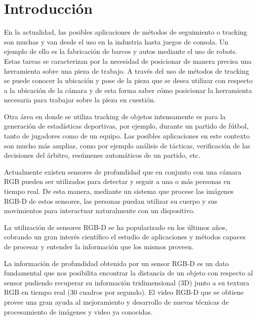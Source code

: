\chapter{Introducción}
En la actualidad, las posibles aplicaciones de métodos de seguimiento o tracking son muchas y van desde el uso en la industria hasta juegos de consola. Un ejemplo de ello es la fabricación de barcos y autos mediante el uso de robots. Estas tareas se caracterizan por la necesidad de posicionar de manera precisa una herramienta sobre una pieza de trabajo. A través del uso de métodos de tracking se puede conocer la ubicación y pose de la pieza que se desea utilizar con respecto a la ubicación de la cámara y de esta forma saber cómo posicionar la herramienta necesaria para trabajar sobre la pieza en cuestión.

Otra área en donde se utiliza tracking de objetos intensamente es para la generación de estadísticas deportivas, por ejemplo, durante un partido de fútbol, tanto de jugadores como de un equipo. Las posibles aplicaciones en este contexto son mucho más amplias, como por ejemplo análisis de tácticas, verificación de las decisiones del árbitro, resúmenes automáticos de un partido, etc.

Actualmente existen sensores de profundidad que en conjunto con una cámara RGB pueden ser utilizados para detectar y seguir a una o más personas en tiempo real. De esta manera, mediante un sistema que procese las imágenes RGB-D de estos sensores, las personas puedan utilizar su cuerpo y sus movimientos para interactuar naturalmente con un dispositivo.

La utilización de sensores RGB-D se ha popularizado en los últimos años, cobrando un gran interés científico el estudio de aplicaciones y métodos capaces de procesar y entender la información que los mismos proveen.

La información de profundidad obtenida por un sensor RGB-D es un dato fundamental que nos posibilita encontrar la distancia de un objeto con respecto al sensor pudiendo recuperar su información tridimensional (3D) junto a su textura RGB en tiempo real (30 cuadros por segundo). El video RGB-D que se obtiene provee una gran ayuda al mejoramiento y desarrollo de nuevas técnicas de procesamiento de imágenes y video ya conocidas.

